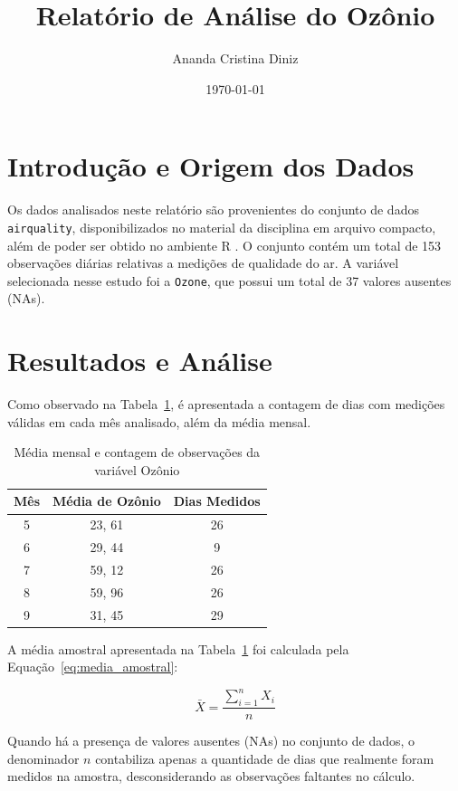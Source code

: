 \documentclass[12pt,a4paper]{article}
\title{Relatório de Análise do Ozônio}
\author{Ananda Cristina Diniz}
\date{\today}
\begin{document}
\maketitle

\section{Introdução e Origem dos Dados}
Os dados analisados neste relatório são provenientes do conjunto de dados \texttt{airquality}, disponibilizados no material da disciplina em arquivo compacto, além de poder ser obtido no ambiente R \citep{Rcore}. O conjunto contém um total de 153 observações diárias relativas a medições de qualidade do ar.
A variável selecionada nesse estudo foi a \texttt{Ozone}, que possui um total de 37 valores ausentes (NAs).

\section{Resultados e Análise}
Como observado na Tabela~\ref{tab:resumo}, é apresentada a contagem de dias com medições válidas em cada mês analisado, além da média mensal.

\begin{table}[htbp]
    \centering
    \begin{tabular}{ccc}
        \toprule
        Mês & Média de Ozônio & Dias Medidos \\
        \midrule
        5 & 23, 61 & 26 \\
        6 & 29, 44 & 9 \\
        7 & 59, 12 & 26 \\
        8 & 59, 96 & 26 \\
        9 & 31, 45 & 29 \\
        \bottomrule
    \end{tabular}
    \caption{Média mensal e contagem de observações da variável Ozônio}
    \label{tab:resumo}
\end{table}

A média amostral apresentada na Tabela~\ref{tab:resumo} foi calculada pela Equação~\eqref{eq:media_amostral}:

\begin{equation}
\label{eq:media_amostral}
\bar{X} = \frac{\sum_{i=1}^{n} X_i}{n}
\end{equation}

Quando há a presença de valores ausentes (NAs) no conjunto de dados, o denominador $n$ contabiliza apenas a quantidade de dias que realmente foram medidos na amostra, desconsiderando as observações faltantes no cálculo.
\end{document}
